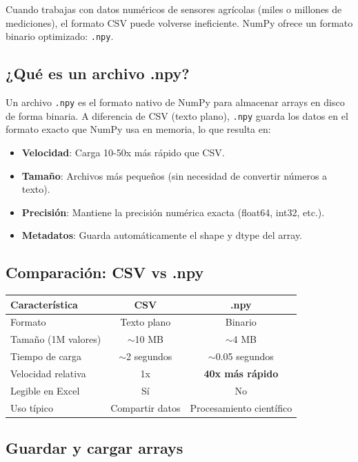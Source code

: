 \documentclass[11pt, a4paper]{article}
\begin{document}
Cuando trabajas con datos numéricos de sensores agrícolas (miles o millones de mediciones), el formato CSV puede volverse ineficiente. NumPy ofrece un formato binario optimizado: \texttt{.npy}.

\subsection{¿Qué es un archivo .npy?}

Un archivo \texttt{.npy} es el formato nativo de NumPy para almacenar arrays en disco de forma binaria. A diferencia de CSV (texto plano), \texttt{.npy} guarda los datos en el formato exacto que NumPy usa en memoria, lo que resulta en:

\begin{itemize}
    \item \textbf{Velocidad}: Carga 10-50x más rápido que CSV.
    \item \textbf{Tamaño}: Archivos más pequeños (sin necesidad de convertir números a texto).
    \item \textbf{Precisión}: Mantiene la precisión numérica exacta (float64, int32, etc.).
    \item \textbf{Metadatos}: Guarda automáticamente el shape y dtype del array.
\end{itemize}

\subsection{Comparación: CSV vs .npy}

\begin{center}
\begin{tabular}{@{}lcc@{}}
\toprule
\textbf{Característica} & \textbf{CSV} & \textbf{.npy} \\
\midrule
Formato & Texto plano & Binario \\
Tamaño (1M valores) & $\sim$10 MB & $\sim$4 MB \\
Tiempo de carga & $\sim$2 segundos & $\sim$0.05 segundos \\
Velocidad relativa & 1x & \textbf{40x más rápido} \\
Legible en Excel & Sí & No \\
Uso típico & Compartir datos & Procesamiento científico \\
\bottomrule
\end{tabular}
\end{center}

\subsection{Guardar y cargar arrays}
\end{document}
